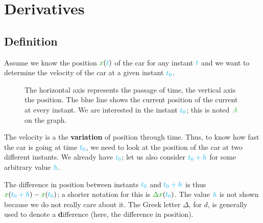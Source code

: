 \section{Derivatives}


\subsection{Definition}

Assume we know the position $\dist{x}(\delay{t})$ of the car for any
instant $\textcolor{cyan}{t}$ and we want to determine the velocity of the car at
a given instant $\textcolor{cyan}{t_0}$.

\begin{figure}[H]
\centering
{}
\caption{
	The horizontal axis represents the passage of time, the vertical
	axis the position. The blue line shows the current position of
	the current at every instant. We are interested in the instant
	$\textcolor{cyan}{t_0}$; this is noted $\posit{A}$ on the graph.
}
\end{figure}

The velocity is a the \textbf{variation} of position through time. Thus,
to know how fast the car is going at time $\textcolor{cyan}{t_0}$, we need to look
at the position of the car at two different instants. We already have
$\textcolor{cyan}{t_0}$; let us also consider $\textcolor{cyan}{t_0+h}$ for some arbitrary
value $\textcolor{cyan}{h}$.

The difference in position between instants $\textcolor{cyan}{t_0}$ and
$\textcolor{cyan}{t_0+h}$ is thus $\dist{x}(\delay{t_0+h}) - \dist{x}(\delay{t_0})$;
a shorter notation for this is $\dist{\Delta x}(\delay{t_0})$. The
value $\textcolor{cyan}{h}$ is not shown because we do not really care about
it. The Greek letter $\Delta$, for $d$, is generally used to denote a
\textbf{d}ifference (here, the difference in position).

